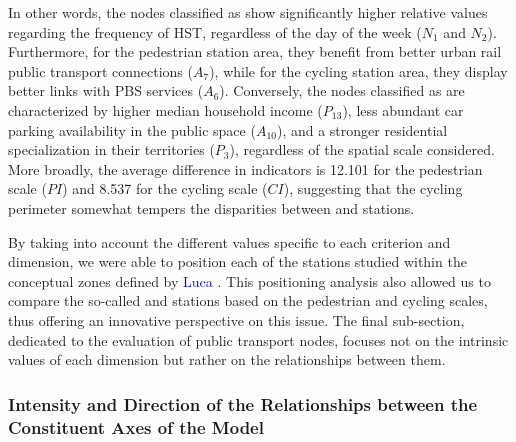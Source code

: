 \begin{refsegment}
In other words, the nodes classified as  show significantly higher relative values regarding the frequency of \acrshort{HST}, regardless of the day of the week (\(N_{1}\) and \(N_{2}\)). Furthermore, for the pedestrian station area, they benefit from better urban rail public transport connections (\(A_{7}\)), while for the cycling station area, they display better links with \acrshort{PBS} services (\(A_{6}\)). Conversely, the nodes classified as  are characterized by higher median household income (\(P_{13}\)), less abundant car parking availability in the \gls{public space} (\(A_{10}\)), and a stronger residential specialization in their territories (\(P_{3}\)), regardless of the spatial scale considered. More broadly, the average difference in indicators is 12.101 for the pedestrian scale (\(PI\)) and 8.537 for the cycling scale (\(CI\)), suggesting that the cycling perimeter somewhat tempers the disparities between  and  stations.%

By taking into account the different values specific to each criterion and dimension, we were able to position each of the stations studied within the conceptual zones defined by \textcolor{blue}{Luca} \textcolor{blue}{\textcite[344]{bertolini_nodes_1996}}. This positioning analysis also allowed us to compare the so-called  and  stations based on the pedestrian and cycling scales, thus offering an innovative perspective on this issue. The final sub-section, dedicated to the evaluation of public transport nodes, focuses not on the intrinsic values of each dimension but rather on the relationships between them.%

\subsubsection*{Intensity and Direction of the Relationships between the Constituent Axes of the Model
    \label{chap6:results-correlation-dimensions}
    }


\end{refsegment}
